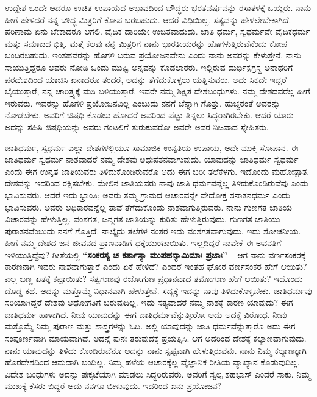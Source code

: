 ಉದ್ದೇಶ ಒಂದೇ ಆದರೂ ಉಚಿತ ಉಪಾಯದ ಅಭಾವದಿಂದ ಬೌದ್ಧರು ಭರತವರ್ಷ\break ವನ್ನು ರಸಾತಳಕ್ಕೆ ಒಯ್ದರು. ನಾನು ಹೀಗೆ ಹೇಳಿದರೆ ನನ್ನ ಬೌದ್ಧ ಮಿತ್ರರಿಗೆ ಕೋಪ ಬರಬಹುದು. ಆದರೆ ವಿಧಿಯಿಲ್ಲ. ಸತ್ಯವನ್ನು ಹೇಳಲೇಬೇಕಾಗಿದೆ. ಪರಿಣಾಮ ಏನು ಬೇಕಾದರೂ ಆಗಲಿ. ವೈದಿಕ ದಾರಿಯೇ ಉಚಿತವಾದುದು. ಜಾತಿ ಧರ್ಮ, ಸ್ವಧರ್ಮವೇ ವೈದಿಕಧರ್ಮ ಮತ್ತು ಸಮಾಜದ ಭಿತ್ತಿ. ಮತ್ತೆ ಕೆಲವು ನನ್ನ ಮಿತ್ರರಿಗೆ ನಾನು ಭಾರತೀಯರನ್ನು ಹೊಗಳುತ್ತಿರುವೆನೆಂದು ಕೋಪ ಬಂದಿರಬಹುದು. ಇಂತಹವರನ್ನು ಹೊಗಳಿ ಬರುವ ಪ್ರಯೋಜನವೇನು ಎಂದು ನಾನು ಅವರನ್ನು ಕೇಳುತ್ತೇನೆ. ನಾನು ಸಾಯುತ್ತಿದ್ದರೂ ಅವರು ನೋಡಿ ಒಂದು ಮುಷ್ಟಿ ಅನ್ನವನ್ನು ಕೊಡಲಾರರು. ಇಲ್ಲಿರುವ ದುರ್ಭಿಕ್ಷಗ್ರಸ್ಥ ಅನಾಥರಿಗೆ ಪರದೇಶದಿಂದ ಯಾಚಿಸಿ ಏನಾದರೂ ತಂದರೆ, ಅದನ್ನು ತೆಗೆದುಕೊಳ್ಳಲು ಯತ್ನಿಸುವರು. ಅದು ಸಿಕ್ಕದೇ ಇದ್ದರೆ ಬೈಯುತ್ತಾರೆ, ನನ್ನ ಚಾರಿತ್ರ್ಯಕ್ಕೆ ಮಸಿ ಬಳಿಯುತ್ತಾರೆ. ಇವರೇ ನಮ್ಮ ಶಿಕ್ಷಿತ ದೇಶಬಂಧುಗಳು. ನಮ್ಮ ದೇಶದವರೆಲ್ಲ ಹೀಗೆ ಇರುವರು. ಇವರನ್ನು ಹೊಗಳಿ ಪ್ರಯೋಜನವಿಲ್ಲ ಎಂಬುದು ನನಗೆ ಚೆನ್ನಾಗಿ ಗೊತ್ತು. ಹುಚ್ಚರಂತೆ ಅವರನ್ನು ನೋಡಬೇಕು. ಅವರಿಗೆ ಔಷಧಿ ಕೊಡಲು ಹೋದರೆ ಅವರಿಂದ ಪೆಟ್ಟು ತಿನ್ನಲು ಸಿದ್ಧರಾಗಿರಬೇಕು. ಆದರೆ ಯಾರು ಅದನ್ನು ಸಹಿಸಿ ಔಷಧಿಯನ್ನು ಅವರು ಗಂಟಲಿಗೆ ತುರುಕುವರೋ ಅವರೇ ಅವರ ನಿಜವಾದ ಸ್ನೇಹಿತರು.

\newpage

ಜಾತಿಧರ್ಮ, ಸ್ವಧರ್ಮ ಎಲ್ಲಾ ದೇಶಗಳಲ್ಲಿಯೂ ಸಾಮಾಜಿಕ ಉನ್ನತಿಯ ಉಪಾಯ, ಅದೇ ಮುಕ್ತಿ ಸೋಪಾನ. ಈ ಜಾತಿಧರ್ಮ ಸ್ವಧರ್ಮ ನಾಶವಾದರೆ ನಮ್ಮ ದೇಶವು ಅಧಃಪತನವಾಗುವುದು. ಯಾವುದನ್ನು ಜಾತಿಧರ್ಮ ಸ್ವಧರ್ಮ ಎಂದು ಈಗ ಉನ್ನತ ಜಾತಿಯವರು ತಿಳಿದುಕೊಂಡಿರುವರೊ ಅದು ಈಗ ಬರೀ ತಲೆಕೆಳಗು. ಇದೊಂದು ಮಹೋತ್ಪಾತ. ದೇಶವನ್ನು ಇದರಿಂದ ರಕ್ಷಿಸಬೇಕು. ಮೇಲಿನ ಜಾತಿಯವರು ನಾವು ಜಾತಿ ಧರ್ಮವನ್ನೆಲ್ಲ ತಿಳಿದುಕೊಂಡಿರುವೆವು ಎಂದು ಭಾವಿಸುವರು. ಆದರೆ ಇದು ಭ್ರಾಂತಿ; ಅವರು ತಮ್ಮ ಗ್ರಾಮದ ಆಚಾರವನ್ನೇ ವೇದೋಕ್ತ ಸನಾತನಧರ್ಮ ಎಂದು ಭಾವಿಸುವರು. ಅವರು ಅಧಿಕಾರವನ್ನೆಲ್ಲ ತಾವೆ ತೆಗೆದುಕೊಂಡು ನಾಶವಾಗುತ್ತಿರುವರು. ನಾನು ಗುಣಗತ ಜಾತಿಯ ವಿಚಾರವನ್ನು ಹೇಳುತ್ತಿಲ್ಲ. ವಂಶಗತ, ಜನ್ಮಗತ ಜಾತಿಯನ್ನು ಕುರಿತು ಹೇಳುತ್ತಿರುವುದು. ಗುಣಗತ ಜಾತಿಯು ಪುರಾತನವೆಂಬುದು ನನಗೆ ಗೊತ್ತಿದೆ. ನಾಲ್ಕೈದು ತಲೆಗಳ ನಂತರ ಇದು ವಂಶಗತವಾಗುವುದು. ಇದು ಶೋಚನೀಯ. ಹೀಗೆ ನಮ್ಮ ದೇಶದ ಜನ ಜೀವನದ ಪ್ರಾಣನಾಡಿಗೆ ಧಕ್ಕೆಯುಂಟಾಯಿತು. ಇಲ್ಲದಿದ್ದರೆ ನಾವೇಕೆ ಈ ಅವನತಿಗೆ ಇಳಿಯುತ್ತಿದ್ದೆವು? ಗೀತೆಯಲ್ಲಿ \textbf{“ಸಂಕರಸ್ಯ ಚ ಕರ್ತಾಸ್ಯಾ ಮುಪಹನ್ಯಾಮಿಮಾಃ ಪ್ರಜಾಃ”} – ಆಗ ನಾನು ವರ್ಣಸಂಕರಕ್ಕೆ ಕಾರಣನಾಗಿ ಇವರು ನಾಶವಾಗುತ್ತಾರೆ ಎಂದು ಏಕೆ ಹೇಳಿದೆ? ಎಂದರೆ ಇಂತಹ ಘೋರ ವರ್ಣಸಂಕರ ಹೇಗೆ ಆಯಿತು? ಎಲ್ಲ ಬಣ್ಣ ಏತಕ್ಕೆ ಕಪ್ಪಾಯಿತು? ಸತ್ವಗುಣವು ರಜೋಗುಣ ಪ್ರಧಾನವಾದ ತಮೋಗುಣ ಹೇಗೆ ಆಯಿತು? ಇದೊಂದು ದೊಡ್ಡ ಕಥೆ. ಅದನ್ನು ಮತ್ತೊಮ್ಮೆ ನಿಧಾನವಾಗಿ ಹೇಳುತ್ತೇನೆ. ಸದ್ಯಕ್ಕೆ ಇದನ್ನು ನಾವು ತಿಳಿದುಕೊಳ್ಳಬೇಕು. ಜಾತಿಧರ್ಮವು ಸರಿಯಾಗಿದ್ದರೆ ದೇಶವು ಅಧೋಗತಿಗೆ ಬರುವುದಿಲ್ಲ. ಇದು ಸತ್ಯವಾದರೆ ನಮ್ಮ ನಾಶಕ್ಕೆ ಕಾರಣ ಯಾವುದು? ಈಗ ಜಾತಿಧರ್ಮ ಹಾಳಾಗಿದೆ. ನೀವು ಯಾವುದನ್ನು ಈಗ ಜಾತಿಧರ್ಮವೆನ್ನುತ್ತೀರೋ ಅದು ಅದಕ್ಕೆ ವಿರೋಧ. ನೀವು ಮತ್ತೊಮ್ಮೆ ನಿಮ್ಮ ಪುರಾಣ ಮತ್ತು ಶಾಸ್ತ್ರಗಳನ್ನು ಓದಿ. ಅಲ್ಲಿ ಯಾವುದನ್ನು ಜಾತಿ ಧರ್ಮವೆನ್ನುತ್ತಾರೊ ಅದು ಈಗ ಸಂಪೂರ್ಣವಾಗಿ ಮಾಯವಾಗಿದೆ. ಅದನ್ನೆ ಪುನಃ ತರುವುದಕ್ಕೆ ಪ್ರಯತ್ನಿಸಿ. ಆಗ ಅದರಿಂದ ದೇಶಕ್ಕೆ ಕಲ್ಯಾಣವಾಗುವುದು. ನಾನು ಯಾವುದನ್ನು ತಿಳಿದು ಕೊಂಡಿರುವೆನೊ ಅದನ್ನು ನಾನು ಸ್ಪಷ್ಟವಾಗಿ ಹೇಳುತ್ತಿರುವೆನು. ನಾನು ನಿಮ್ಮ ಕಲ್ಯಾಣಕ್ಕಾಗಿ ಹೊರದೇಶದಿಂದ ಆಮದಾಗಿ ಬಂದಿಲ್ಲ. ನಿಮ್ಮ ಹಳೆಯ ಆಚಾರಕ್ಕೆಲ್ಲ ವೈಜ್ಞಾನಿಕ ರೀತಿಯ ವ್ಯಾಖ್ಯಾನ ಕೊಡುವುದಿಲ್ಲ. ವಿದೇಶ ಬಂಧುಗಳು ಅದನ್ನು ಪುಕ್ಕಟೆಯಾಗಿ ಮಾಡಲು ಸಿದ್ಧರಿರುವರು. ಅವರಿಗೆ ಸ್ವಲ್ಪ ಶಹಭಾಸ್​ ಎಂದರೆ ಸಾಕು. ನಿಮ್ಮ ಮುಖಕ್ಕೆ ಕೆಸರು ಬಿದ್ದರೆ ಅದು ನನಗೂ ಬೀಳುವುದು. ಇದರಿಂದ ಏನು ಪ್ರಯೋಜನ?


